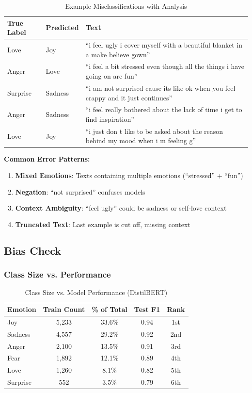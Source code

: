 \documentclass[12pt,a4paper]{article}
\begin{document}
\begin{table}[H]
\centering
\small
\begin{tabular}{@{}p{2.2cm}p{2.2cm}p{8cm}@{}}
\toprule
\textbf{True Label} & \textbf{Predicted} & \textbf{Text} \\ \midrule
Love & Joy & ``i feel ugly i cover myself with a beautiful blanket in a make believe gown'' \\
Anger & Love & ``i feel a bit stressed even though all the things i have going on are fun'' \\
Surprise & Sadness & ``i am not surprised cause its like ok when you feel crappy and it just continues'' \\
Anger & Sadness & ``i feel really bothered about the lack of time i get to find inspiration'' \\
Love & Joy & ``i just don t like to be asked about the reason behind my mood when i m feeling g'' \\ \bottomrule
\end{tabular}
\caption{Example Misclassifications with Analysis}
\label{tab:sample_errors}
\end{table}

\textbf{Common Error Patterns:}
\begin{enumerate}
    \item \textbf{Mixed Emotions}: Texts containing multiple emotions (``stressed'' + ``fun'')
    \item \textbf{Negation}: ``not surprised'' confuses models
    \item \textbf{Context Ambiguity}: ``feel ugly'' could be sadness or self-love context
    \item \textbf{Truncated Text}: Last example is cut off, missing context
\end{enumerate}

\subsection{Bias Check}

\subsubsection{Class Size vs. Performance}

\begin{table}[H]
\centering
\begin{tabular}{@{}lcccc@{}}
\toprule
\textbf{Emotion} & \textbf{Train Count} & \textbf{\% of Total} & \textbf{Test F1} & \textbf{Rank} \\ \midrule
Joy & 5,233 & 33.6\% & 0.94 & 1st \\
Sadness & 4,557 & 29.2\% & 0.92 & 2nd \\
Anger & 2,100 & 13.5\% & 0.91 & 3rd \\
Fear & 1,892 & 12.1\% & 0.89 & 4th \\
Love & 1,260 & 8.1\% & 0.82 & 5th \\
Surprise & 552 & 3.5\% & 0.79 & 6th \\ \bottomrule
\end{tabular}
\caption{Class Size vs. Model Performance (DistilBERT)}
\label{tab:bias_check}
\end{table}
\end{document}
